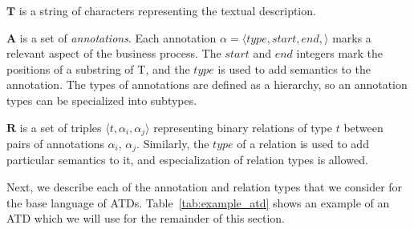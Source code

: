 
\begin{description}
\item{$\mathbf{T}$}{ is a string of characters representing the textual description.}
\item{$\mathbf{A}$}{ is a set of \emph{annotations}. Each annotation $\alpha =
    \langle type, start, end, \rangle$ marks a relevant aspect of the business
    process. The $start$ and $end$ integers mark the positions of a substring of
    T, and the $type$ is used to add semantics to the annotation. The types of
    annotations are defined as a hierarchy, so an annotation types can be specialized
    into subtypes.}
\item{$\mathbf{R}$}{ is a set of triples $\langle t, \alpha_i,
    \alpha_j \rangle$ representing binary relations of type $t$ between pairs of
    annotations $\alpha_i$, $\alpha_j$. Similarly, the $type$ of a relation is
    used to add particular semantics to it, and especialization of relation
    types is allowed.}
\end{description}

Next, we describe each of the annotation and relation types that we consider for
the base language of ATDs. Table~\ref{tab:example_atd} shows an example of an
ATD which we will use for the remainder of this section.

